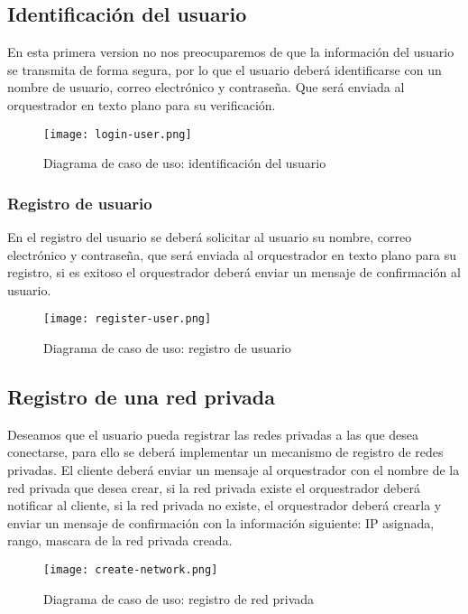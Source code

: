 \subsection{Identificación del usuario}

En esta primera version no nos preocuparemos de que la información del usuario se transmita de forma segura, por lo que el usuario deberá identificarse con un nombre de usuario, correo electrónico y contraseña. Que será enviada al orquestrador en texto plano para su verificación.

\begin{figure}[h!]
    \centering
    \texttt{[image: login-user.png]}
    \caption{Diagrama de caso de uso: identificación del usuario}
\end{figure}

\subsubsection{Registro de usuario}

En el registro del usuario se deberá solicitar al usuario su nombre, correo electrónico y contraseña, que será enviada al orquestrador en texto plano para su registro, si es exitoso el orquestrador deberá enviar un mensaje de confirmación al usuario.

\begin{figure}[h!]
    \centering
    \texttt{[image: register-user.png]}
    \caption{Diagrama de caso de uso: registro de usuario}
\end{figure}

\subsection{Registro de una red privada}

Deseamos que el usuario pueda registrar las redes privadas a las que desea conectarse, para ello se deberá implementar un mecanismo de registro de redes privadas.
El cliente deberá enviar un mensaje al orquestrador con el nombre de la red privada que desea crear, si la red privada existe el orquestrador deberá notificar al cliente, si la red privada no existe, el orquestrador deberá crearla y enviar un mensaje de confirmación con la información siguiente: IP asignada, rango, mascara de la red privada creada.

\begin{figure}[h!]
    \centering
    \texttt{[image: create-network.png]}
    \caption{Diagrama de caso de uso: registro de red privada}
\end{figure}


